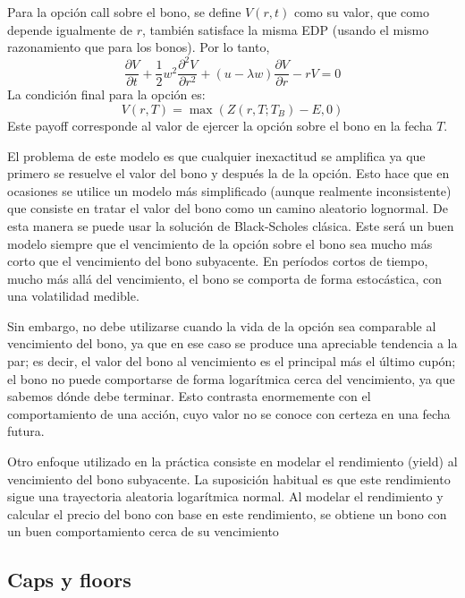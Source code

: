 Para la opción call sobre el bono, se define $V(r, t)$ como su valor, que como depende igualmente de $r$, también satisface la misma EDP (usando el mismo razonamiento que para los bonos). Por lo tanto,
\begin{equation*}
    \boxed{\frac{\partial V}{\partial t} + \frac{1}{2} w^2 \frac{\partial^2 V}{\partial r^2} + (u - \lambda w) \frac{\partial V}{\partial r} - rV = 0}
\end{equation*}
La condición final para la opción es:
\begin{equation*}
    \boxed{V(r, T) = \max(Z(r, T; T_B) - E, 0)}
\end{equation*}
Este payoff corresponde al valor de ejercer la opción sobre el bono en la fecha $T$.


El problema de este modelo es que cualquier inexactitud se amplifica ya que primero se resuelve el valor del bono y después la de la opción. Esto hace que en ocasiones se utilice un modelo más simplificado (aunque realmente inconsistente) que consiste en tratar el valor del bono como un camino aleatorio lognormal. De esta manera se puede usar la solución de Black-Scholes clásica. Este será un buen modelo siempre que el vencimiento de la opción sobre el bono sea mucho más corto que el vencimiento del bono subyacente. En períodos cortos de tiempo, mucho más allá del vencimiento, el bono se comporta de forma estocástica, con una volatilidad medible.

Sin embargo, no debe utilizarse cuando la vida de la opción sea comparable al vencimiento del bono, ya que en ese caso se produce una apreciable tendencia a la par; es decir, el valor del bono al vencimiento es el principal más el último cupón; el bono no puede comportarse de forma logarítmica cerca del vencimiento, ya que sabemos dónde debe terminar. Esto contrasta enormemente con el comportamiento de una acción, cuyo valor no se conoce con certeza en una fecha futura.

Otro enfoque utilizado en la práctica consiste en modelar el rendimiento (yield) al vencimiento del bono subyacente. La suposición habitual es que este rendimiento sigue una trayectoria aleatoria logarítmica normal. Al modelar el rendimiento y calcular el precio del bono con base en este rendimiento, se obtiene un bono con un buen comportamiento cerca de su vencimiento








\subsection{Caps y floors}

